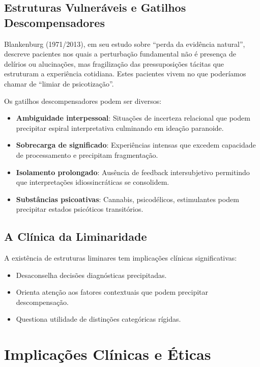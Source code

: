 \subsection{Estruturas Vulneráveis e Gatilhos Descompensadores}

Blankenburg (1971/2013), em seu estudo sobre \enquote{perda da evidência natural}, descreve pacientes nos quais a perturbação fundamental não é presença de delírios ou alucinações, mas fragilização das pressuposições tácitas que estruturam a experiência cotidiana. Estes pacientes vivem no que poderíamos chamar de \enquote{limiar de psicotização}.

Os gatilhos descompensadores podem ser diversos:
\begin{itemize}
\item \textbf{Ambiguidade interpessoal}: Situações de incerteza relacional que podem precipitar espiral interpretativa culminando em ideação paranoide.
\item \textbf{Sobrecarga de significado}: Experiências intensas que excedem capacidade de processamento e precipitam fragmentação.
\item \textbf{Isolamento prolongado}: Ausência de feedback intersubjetivo permitindo que interpretações idiossincráticas se consolidem.
\item \textbf{Substâncias psicoativas}: Cannabis, psicodélicos, estimulantes podem precipitar estados psicóticos transitórios.
\end{itemize}

\subsection{A Clínica da Liminaridade}

A existência de estruturas liminares tem implicações clínicas significativas:

\begin{itemize}
\item Desaconselha decisões diagnósticas precipitadas.
\item Orienta atenção aos fatores contextuais que podem precipitar descompensação.
\item Questiona utilidade de distinções categóricas rígidas.
\end{itemize}

\section{Implicações Clínicas e Éticas}
\label{sec:implicacoes-clinicas}


